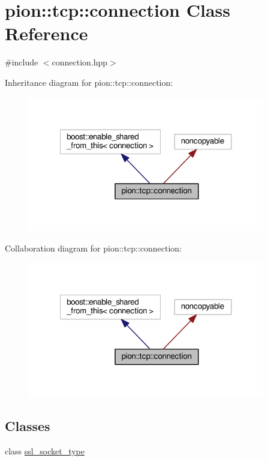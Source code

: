 \hypertarget{classpion_1_1tcp_1_1connection}{\section{pion\-:\-:tcp\-:\-:connection Class Reference}
\label{classpion_1_1tcp_1_1connection}
}


{\ttfamily \#include $<$connection.\-hpp$>$}



Inheritance diagram for pion\-:\-:tcp\-:\-:connection\-:
\nopagebreak
\begin{figure}[H]
\begin{center}
\leavevmode
\includegraphics[width=293pt]{classpion_1_1tcp_1_1connection__inherit__graph}
\end{center}
\end{figure}


Collaboration diagram for pion\-:\-:tcp\-:\-:connection\-:
\nopagebreak
\begin{figure}[H]
\begin{center}
\leavevmode
\includegraphics[width=293pt]{classpion_1_1tcp_1_1connection__coll__graph}
\end{center}
\end{figure}
\subsection*{Classes}
\begin{DoxyCompactItemize}
\item 
class \hyperlink{classpion_1_1tcp_1_1connection_1_1ssl__socket__type}{ssl\-\_\-socket\-\_\-type}
\end{DoxyCompactItemize}
